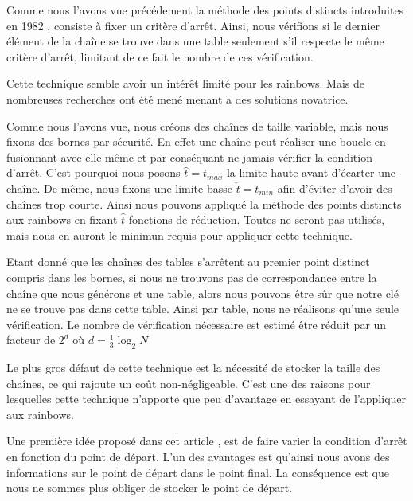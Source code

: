 	Comme nous l'avons vue précédement la méthode des points distincts introduites en 1982 \cite{Rivest}, consiste à fixer un critère d'arrêt. Ainsi, nous vérifions si le dernier élément de la chaîne se trouve dans une table seulement s'il respecte le même critère d'arrêt, limitant de ce fait le nombre de ces vérification.

	\bigskip

	Cette technique semble avoir un intérêt limité pour les \glspl{rainbow}. Mais de nombreuses recherches ont été mené menant a des solutions novatrice.

	\bigskip


		Comme nous l'avons vue, nous créons des chaînes de taille variable, mais nous fixons des bornes par sécurité. En effet une chaîne peut réaliser une boucle en fusionnant avec elle-même et par conséquant ne jamais vérifier la condition d'arrêt. C'est pourquoi nous posons $\hat{t}=t_{max}$ la limite haute avant d'écarter une chaîne. De même, nous fixons une limite basse $\check{t}=t_{min}$ afin d'éviter d'avoir des chaînes trop courte. Ainsi nous pouvons appliqué la méthode des points distincts aux \glspl{rainbow} en fixant $\hat{t}$ fonctions de réduction. Toutes ne seront pas utilisés, mais nous en auront le minimun requis pour appliquer cette technique.

		\bigskip

		Etant donné que les chaînes des tables s'arrêtent au premier point distinct compris dans les bornes, si nous ne trouvons pas de correspondance entre la chaîne que nous générons et une table, alors nous pouvons être sûr que notre clé ne se trouve pas dans cette table. Ainsi par table, nous ne réalisons qu'une seule vérification. Le nombre de vérification nécessaire est estimé être réduit par un facteur de $2^d$ où $d=\frac{1}{3}\log_2 N$

		\bigskip

		Le plus gros défaut de cette technique est la nécessité de stocker la taille des chaînes, ce qui rajoute un coût non-négligeable. C'est une des raisons pour lesquelles cette technique n'apporte que peu d'avantage en essayant de l'appliquer aux \glspl{rainbow}.

		\bigskip


		Une première idée proposé dans cet article \cite{VDP}, est de faire varier la condition d'arrêt en fonction du point de départ. L'un des avantages est qu'ainsi nous avons des informations sur le point de départ dans le point final. La conséquence est que nous ne sommes plus obliger de stocker le point de départ.

